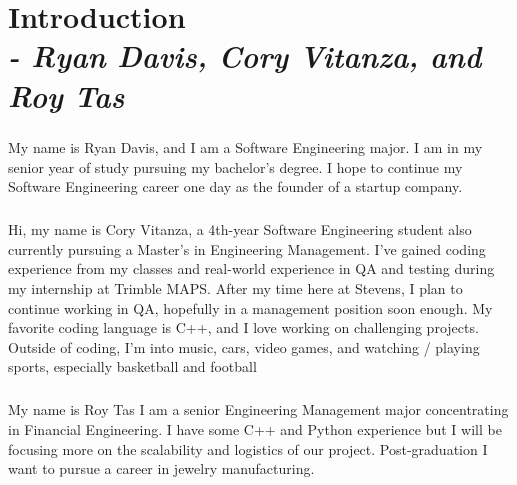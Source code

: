 \chapter{Introduction \\
\small{\textit{- Ryan Davis, Cory Vitanza, and Roy Tas}}
\label{Chapter::Introduction}}

\paragraph {} My name is Ryan Davis, and I am a Software Engineering major. I am in my senior year of study pursuing my bachelor’s degree. I hope to continue my Software Engineering career one day as the founder of a startup company. 

\paragraph {} Hi, my name is Cory Vitanza, a 4th-year Software Engineering student also currently pursuing a Master’s in Engineering Management. I’ve gained coding experience from my classes and real-world experience in QA and testing during my internship at Trimble MAPS. After my time here at Stevens, I plan to continue working in QA, hopefully in a management position soon enough. My favorite coding language is C++, and I love working on challenging projects. Outside of coding, I’m into music, cars, video games, and watching / playing sports, especially basketball and football

\paragraph{}My name is Roy Tas I am a senior Engineering Management major concentrating in Financial Engineering. I have some C++ and Python experience but I will be focusing more on the scalability and logistics of our project. Post-graduation I want to pursue a career in jewelry manufacturing.
